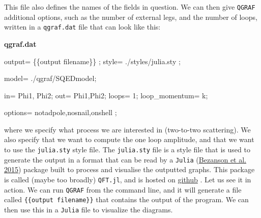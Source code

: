 \documentclass[
  11pt,
  a4paper,
  DIV=11,
  numbers=noendperiod,
  oneside]{scrreprt}
\newenvironment{Shaded}{\begin{snugshade}}{\end{snugshade}}
\newcommand{\NormalTok}[1]{\textcolor[rgb]{0.00,0.23,0.31}{#1}}
\DeclareRobustCommand{\[}{\begin{equation}}
\DeclareRobustCommand{\]}{\end{equation}}
\begin{document}
This file also defines the names of the fields in question. We can then
give \texttt{QGRAF} additional options, such as the number of external
legs, and the number of loops, written in a \texttt{qgraf.dat} file that
can look like this:

\textbf{qgraf.dat}

\begin{Shaded}
\begin{Highlighting}[]
\NormalTok{output= \textquotesingle{}\{\{output filename\}\}\textquotesingle{} ;}
\NormalTok{style= \textquotesingle{}./styles/julia.sty\textquotesingle{} ; }

\NormalTok{model= \textquotesingle{}./qgraf/SQEDmodel\textquotesingle{};}

\NormalTok{in= Phi1,  Phi2;}
\NormalTok{out= Phi1,Phi2;}
\NormalTok{loops= 1;}
\NormalTok{loop\_momentum= k;}

\NormalTok{options=  notadpole,nosnail,onshell ;}
\end{Highlighting}
\end{Shaded}

where we specify what process we are interested in (two-to-two
scattering). We also specify that we want to compute the one loop
amplitude, and that we want to use the \texttt{julia.sty} style file.
The \texttt{julia.sty} file is a style file that is used to generate the
output in a format that can be read by a \texttt{Julia}
(\protect\hyperlink{ref-Bezanson:2015}{Bezanson et al. 2015}) package
built to process and visualise the outputted graphs. This package is
called (maybe too broadly) \texttt{QFT.jl}, and is hosted on
\href{https://github.com/lcnhb/QFT.jl}{github} . Let us see it in
action. We can run \texttt{QGRAF} from the command line, and it will
generate a file called \texttt{\{\{output\ filename\}\}} that contains
the output of the program. We can then use this in a \texttt{Julia} file
to visualize the diagrams.
\end{document}
